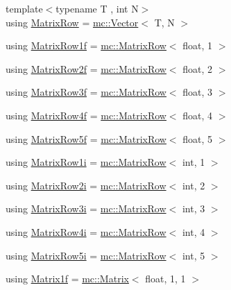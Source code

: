 \begin{DoxyCompactItemize}
\item 
{\footnotesize template$<$typename T , int N$>$ }\\using \hyperlink{namespacemc_a864ada9f6799e62e26d4b02bbd1ac4c2}{Matrix\+Row} = \hyperlink{classmc_1_1_vector}{mc\+::\+Vector}$<$ T, N $>$
\item 
using \hyperlink{namespacemc_a5a0f82f5a673329409088bb9dd2d7f7b}{Matrix\+Row1f} = \hyperlink{namespacemc_a864ada9f6799e62e26d4b02bbd1ac4c2}{mc\+::\+Matrix\+Row}$<$ float, 1 $>$
\item 
using \hyperlink{namespacemc_a3b4a3205e212db1db4bc8e47fe4cc312}{Matrix\+Row2f} = \hyperlink{namespacemc_a864ada9f6799e62e26d4b02bbd1ac4c2}{mc\+::\+Matrix\+Row}$<$ float, 2 $>$
\item 
using \hyperlink{namespacemc_a8b0d875a0b758d1b6ca600bfca37f1b9}{Matrix\+Row3f} = \hyperlink{namespacemc_a864ada9f6799e62e26d4b02bbd1ac4c2}{mc\+::\+Matrix\+Row}$<$ float, 3 $>$
\item 
using \hyperlink{namespacemc_ac76f1616fbf0b724f9a8b957b2635475}{Matrix\+Row4f} = \hyperlink{namespacemc_a864ada9f6799e62e26d4b02bbd1ac4c2}{mc\+::\+Matrix\+Row}$<$ float, 4 $>$
\item 
using \hyperlink{namespacemc_a2dc58d627f7c4287360df5a1852050d4}{Matrix\+Row5f} = \hyperlink{namespacemc_a864ada9f6799e62e26d4b02bbd1ac4c2}{mc\+::\+Matrix\+Row}$<$ float, 5 $>$
\item 
using \hyperlink{namespacemc_a93694e95604472a1c26070b1b70990cb}{Matrix\+Row1i} = \hyperlink{namespacemc_a864ada9f6799e62e26d4b02bbd1ac4c2}{mc\+::\+Matrix\+Row}$<$ int, 1 $>$
\item 
using \hyperlink{namespacemc_a668aec14caead769bdd4d7066e8e15fe}{Matrix\+Row2i} = \hyperlink{namespacemc_a864ada9f6799e62e26d4b02bbd1ac4c2}{mc\+::\+Matrix\+Row}$<$ int, 2 $>$
\item 
using \hyperlink{namespacemc_a3ed70e2494e81425a982a4d7abedb1b8}{Matrix\+Row3i} = \hyperlink{namespacemc_a864ada9f6799e62e26d4b02bbd1ac4c2}{mc\+::\+Matrix\+Row}$<$ int, 3 $>$
\item 
using \hyperlink{namespacemc_ae0265bef81dbac954f173a2408c9ce60}{Matrix\+Row4i} = \hyperlink{namespacemc_a864ada9f6799e62e26d4b02bbd1ac4c2}{mc\+::\+Matrix\+Row}$<$ int, 4 $>$
\item 
using \hyperlink{namespacemc_a458456087c23e1a0463a13c566050b0b}{Matrix\+Row5i} = \hyperlink{namespacemc_a864ada9f6799e62e26d4b02bbd1ac4c2}{mc\+::\+Matrix\+Row}$<$ int, 5 $>$
\item 
using \hyperlink{namespacemc_a6b3e43f58be598160b2a72a45f8da74a}{Matrix1f} = \hyperlink{structmc_1_1_matrix}{mc\+::\+Matrix}$<$ float, 1, 1 $>$

\end{DoxyCompactItemize}
